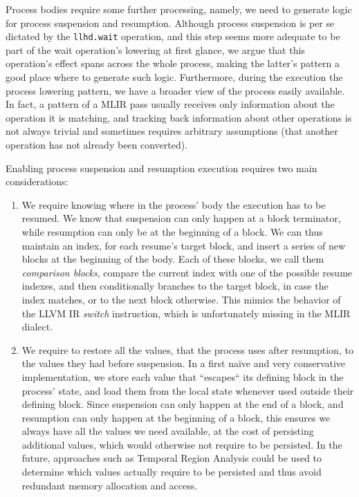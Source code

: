 Process bodies require some further processing, namely, we need to generate logic for process suspension and resumption. Although process suspension is per se dictated by the \texttt{llhd.wait} operation, and this step seems more adequate to be part of the wait operation's lowering at first glance, we argue that this operation's effect spans across the whole process, making the latter's pattern a good place where to generate such logic. Furthermore, during the execution the process lowering pattern, we have a broader view of the process easily available. In fact, a pattern of a MLIR pass usually receives only information about the operation it is matching, and tracking back information about other operations is not always trivial and sometimes requires arbitrary assumptions (\eg that another operation has not already been converted).

Enabling process suspension and resumption execution requires two main considerations:
\begin{enumerate}
    \item We require knowing where in the process' body the execution has to be resumed. We know that suspension can only happen at a block terminator, while resumption can only be at the beginning of a block. We can thus maintain an index, for each resume's target block, and insert a series of new blocks at the beginning of the body. Each of these blocks, we call them \textit{comparison blocks}, compare the current index with one of the possible resume indexes, and then conditionally branches to the target block, in case the index matches, or to the next block otherwise. This mimics the behavior of the LLVM IR \textit{switch} instruction, which is unfortunately missing in the MLIR dialect.
    \item We require to restore all the values, that the process uses after resumption, to the values they had before suspension. In a first naïve and very conservative implementation, we store each value that “escapes“ its defining block in the process' state, and load them from the local state whenever used outside their defining block. Since suspension can only happen at the end of a block, and resumption can only happen at the beginning of a block, this ensures we always have all the values we need available, at the cost of persisting additional values, which would otherwise not require to be persisted. In the future, approaches such as Temporal Region Analysis could be used to determine which values actually require to be persisted and thus avoid redundant memory allocation and access.
\end{enumerate}

